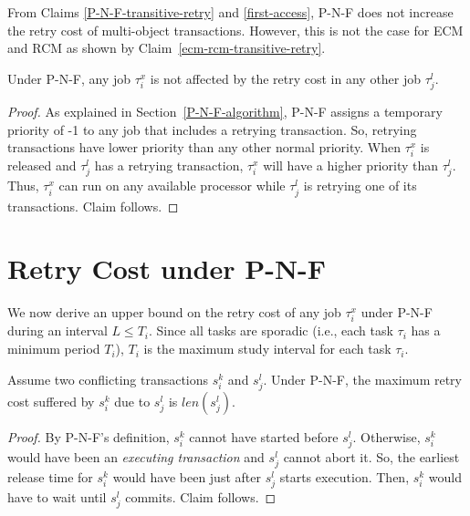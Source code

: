From Claims \ref{P-N-F-transitive-retry} and \ref{first-access}, P-N-F does not increase the retry cost of multi-object transactions. However, this is not the case for ECM and RCM as shown by Claim~\ref{ecm-rcm-transitive-retry}. %

\begin{clm}\label{higher retry does not affect response}
Under P-N-F, any job $\tau_{i}^{x}$ is not affected by the retry cost in any other
job $\tau_{j}^{l}$.
\end{clm}
\begin{proof}
As explained in Section~\ref{P-N-F-algorithm}, P-N-F assigns a temporary priority of -1 to any job that includes a retrying transaction. So, retrying transactions have lower priority than any other normal priority.
When $\tau_{i}^{x}$ is released and $\tau_j^l$ has a retrying transaction, $\tau_i^x$ will have a higher priority
than $\tau_j^l$. Thus, $\tau_i^x$ can run on any available processor while $\tau_j^l$ is retrying one of its transactions. Claim follows.
\end{proof}


\section{Retry Cost under P-N-F\label{rc pnf sec}}

We now derive an upper bound on the retry cost of any job $\tau_i^x$ under P-N-F during an interval $L\le T_i$. Since all tasks are sporadic (i.e., each task $\tau_i$ has a minimum period $T_i$), $T_i$ is the maximum study interval for each task $\tau_i$.

\begin{clm}\label{two transactions retry cost P-N-F}
Assume two conflicting transactions $s_{i}^{k}$ and $s_{j}^{l}$.
Under P-N-F, the maximum retry cost suffered by $s_{i}^{k}$ due
to $s_{j}^{l}$ is $len(s_{j}^{l})$.
\end{clm}
\begin{proof}
By P-N-F's definition, $s_{i}^{k}$ cannot have started before
$s_{j}^{l}$. Otherwise, $s_i^k$ would have been an \emph{executing transaction} and $s_{j}^{l}$ cannot abort it. So, the earliest release time for $s_{i}^{k}$ would have been just after $s_{j}^{l}$ starts execution. Then, $s_i^k$ would have to wait until $s_{j}^{l}$
commits. Claim follows.
\end{proof}


